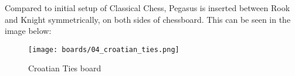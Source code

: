 Compared to initial setup of Classical Chess, Pegasus is inserted between Rook and Knight
symmetrically, on both sides of chessboard. This can be seen in the image below:

\noindent
\begin{figure}[h]
\texttt{[image: boards/04\_croatian\_ties.png]}
\caption{Croatian Ties board}
\label{fig:04_croatian_ties}
\end{figure}

\clearpage %
